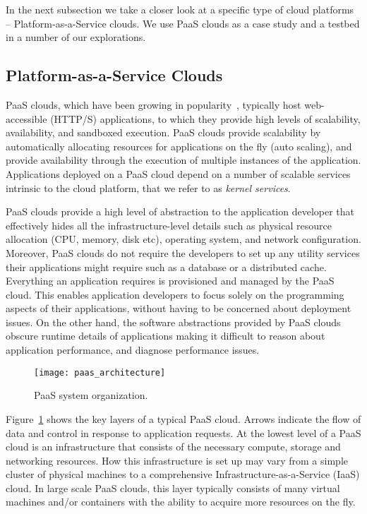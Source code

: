 In the next subsection we take a closer look at a specific type of cloud platforms -- Platform-as-a-Service clouds.
We use PaaS clouds as a case study and a testbed in a number of our explorations.

\subsection{Platform-as-a-Service Clouds}

PaaS clouds, which have been growing in popularity~\cite{paas-growth,paas-growth2}, 
typically host web-accessible (HTTP/S) applications, to which they provide
high levels of scalability, availability, and sandboxed execution. PaaS clouds
provide scalability by automatically allocating resources for
applications on the fly (auto scaling), and provide availability through the
execution of multiple instances of the application. Applications deployed on
a PaaS cloud depend on a number of scalable services intrinsic to the 
cloud platform, that we refer to as \textit{kernel services}.

PaaS clouds provide a high level of
abstraction to the application developer that effectively hides all the
infra\-structure-level details such as physical resource allocation (CPU,
memory, disk etc), operating system, and network configuration. 
Moreover, PaaS clouds do not require the developers
to set up any utility services their applications might require such as a 
database or a distributed cache. 
Everything an application requires is provisioned and managed by the PaaS cloud.
This enables
application developers to focus solely on the programming aspects of their
applications, without having to be concerned about deployment issues. On
the other hand, the software abstractions provided by PaaS clouds obscure
runtime details of applications making it difficult to reason about application
performance, and diagnose performance issues.

\begin{figure}
\centering
\texttt{[image: paas\_architecture]}
\caption{PaaS system organization.}
\label{fig:paas_architecture}
\end{figure}

Figure~\ref{fig:paas_architecture} shows the key layers of a typical PaaS cloud. Arrows indicate
the flow of data and control in response to application requests.
At the lowest level of a PaaS cloud is an infrastructure that consists of the necessary compute, storage
and networking resources. How this infrastructure is set up may vary from a simple cluster of physical 
machines to a comprehensive Infrastructure-as-a-Service (IaaS) cloud. In large scale PaaS clouds,
this layer typically consists of many virtual machines and/or containers with the ability to acquire more
resources on the fly.

